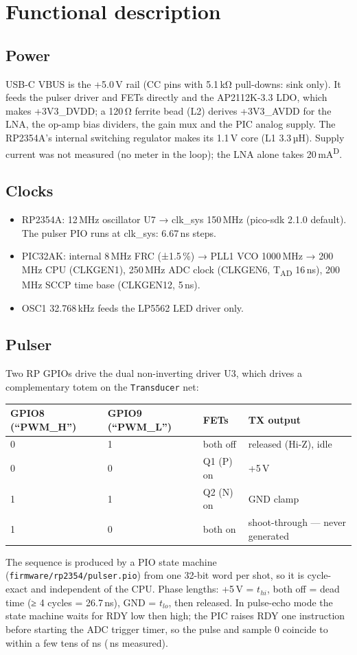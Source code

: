 \documentclass[10pt,a4paper]{article}
\newcommand{\cmd}[1]{\texttt{#1}}
\newcommand{\des}{\textsuperscript{D}}
\begin{document}
\section{Functional description}
\subsection{Power}
USB-C VBUS is the +5.0\,V rail (CC pins with 5.1\,kΩ pull-downs: sink only). It feeds the pulser driver and FETs directly and the
AP2112K-3.3 LDO, which makes +3V3\_DVDD; a 120\,Ω ferrite bead (L2) derives +3V3\_AVDD for the LNA, the op-amp bias dividers, the
gain mux and the PIC analog supply. The RP2354A's internal switching regulator makes its 1.1\,V core (L1 3.3\,µH).
Supply current was not measured (no meter in the loop); the LNA alone takes 20\,mA\des.

\subsection{Clocks}
\begin{itemize}
  \item RP2354A: 12\,MHz oscillator U7 → clk\_sys 150\,MHz (pico-sdk 2.1.0 default). The pulser PIO runs at clk\_sys: 6.67\,ns steps.
  \item PIC32AK: internal 8\,MHz FRC (±1.5\,\%) → PLL1 VCO 1000\,MHz → 200\,MHz CPU (CLKGEN1), 250\,MHz ADC clock (CLKGEN6, T\textsubscript{AD} 16\,ns), 200\,MHz SCCP time base (CLKGEN12, 5\,ns).
  \item OSC1 32.768\,kHz feeds the LP5562 LED driver only.
\end{itemize}

\subsection{Pulser}
Two RP GPIOs drive the dual non-inverting driver U3, which drives a complementary totem on the \cmd{Transducer} net:
\begin{center}\small
\begin{tabular}{@{}llll@{}}\toprule
\textbf{GPIO8 (“PWM\_H”)} & \textbf{GPIO9 (“PWM\_L”)} & \textbf{FETs} & \textbf{TX output}\\\midrule
0 & 1 & both off & released (Hi-Z), idle\\
0 & 0 & Q1 (P) on & +5\,V\\
1 & 1 & Q2 (N) on & GND clamp\\
1 & 0 & both on & \textcolor{warn}{shoot-through — never generated}\\\bottomrule
\end{tabular}\end{center}
The sequence is produced by a PIO state machine (\texttt{firmware/rp2354/pulser.pio}) from one 32-bit word per shot, so it is
cycle-exact and independent of the CPU. Phase lengths: +5\,V = $t_{hi}$, both off = dead time (≥ 4 cycles = 26.7\,ns), GND = $t_{lo}$,
then released. In pulse-echo mode the state machine waits for RDY low then high; the PIC raises RDY one instruction before
starting the ADC trigger timer, so the pulse and sample 0 coincide to within a few tens of ns (\vonsetns\,ns measured).
\end{document}
